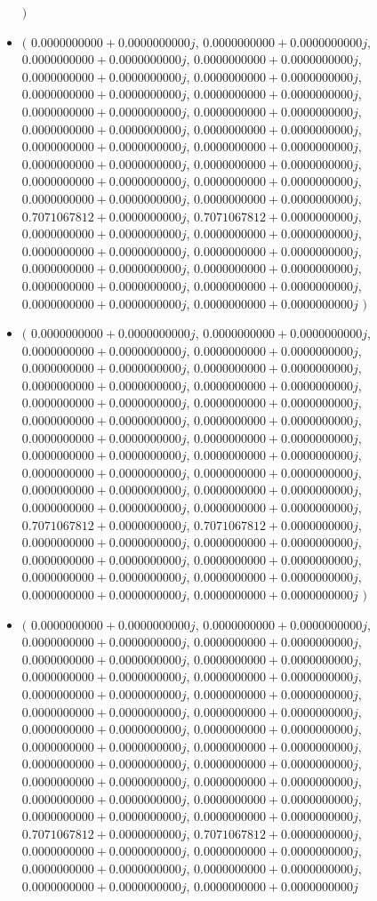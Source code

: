 \documentclass[14pt,a4paper]{article}
\begin{document}
\begin{itemize}
$\big)$
\item
$\big($
$0.0000000000+0.0000000000j$, $0.0000000000+0.0000000000j$, $0.0000000000+0.0000000000j$, $0.0000000000+0.0000000000j$, $0.0000000000+0.0000000000j$, $0.0000000000+0.0000000000j$, $0.0000000000+0.0000000000j$, $0.0000000000+0.0000000000j$, $0.0000000000+0.0000000000j$, $0.0000000000+0.0000000000j$, $0.0000000000+0.0000000000j$, $0.0000000000+0.0000000000j$, $0.0000000000+0.0000000000j$, $0.0000000000+0.0000000000j$, $0.0000000000+0.0000000000j$, $0.0000000000+0.0000000000j$, $0.0000000000+0.0000000000j$, $0.0000000000+0.0000000000j$, $0.0000000000+0.0000000000j$, $0.0000000000+0.0000000000j$, $0.7071067812+0.0000000000j$, $0.7071067812+0.0000000000j$, $0.0000000000+0.0000000000j$, $0.0000000000+0.0000000000j$, $0.0000000000+0.0000000000j$, $0.0000000000+0.0000000000j$, $0.0000000000+0.0000000000j$, $0.0000000000+0.0000000000j$, $0.0000000000+0.0000000000j$, $0.0000000000+0.0000000000j$, $0.0000000000+0.0000000000j$, $0.0000000000+0.0000000000j$
$\big)$
\item
$\big($
$0.0000000000+0.0000000000j$, $0.0000000000+0.0000000000j$, $0.0000000000+0.0000000000j$, $0.0000000000+0.0000000000j$, $0.0000000000+0.0000000000j$, $0.0000000000+0.0000000000j$, $0.0000000000+0.0000000000j$, $0.0000000000+0.0000000000j$, $0.0000000000+0.0000000000j$, $0.0000000000+0.0000000000j$, $0.0000000000+0.0000000000j$, $0.0000000000+0.0000000000j$, $0.0000000000+0.0000000000j$, $0.0000000000+0.0000000000j$, $0.0000000000+0.0000000000j$, $0.0000000000+0.0000000000j$, $0.0000000000+0.0000000000j$, $0.0000000000+0.0000000000j$, $0.0000000000+0.0000000000j$, $0.0000000000+0.0000000000j$, $0.0000000000+0.0000000000j$, $0.0000000000+0.0000000000j$, $0.7071067812+0.0000000000j$, $0.7071067812+0.0000000000j$, $0.0000000000+0.0000000000j$, $0.0000000000+0.0000000000j$, $0.0000000000+0.0000000000j$, $0.0000000000+0.0000000000j$, $0.0000000000+0.0000000000j$, $0.0000000000+0.0000000000j$, $0.0000000000+0.0000000000j$, $0.0000000000+0.0000000000j$
$\big)$
\item
$\big($
$0.0000000000+0.0000000000j$, $0.0000000000+0.0000000000j$, $0.0000000000+0.0000000000j$, $0.0000000000+0.0000000000j$, $0.0000000000+0.0000000000j$, $0.0000000000+0.0000000000j$, $0.0000000000+0.0000000000j$, $0.0000000000+0.0000000000j$, $0.0000000000+0.0000000000j$, $0.0000000000+0.0000000000j$, $0.0000000000+0.0000000000j$, $0.0000000000+0.0000000000j$, $0.0000000000+0.0000000000j$, $0.0000000000+0.0000000000j$, $0.0000000000+0.0000000000j$, $0.0000000000+0.0000000000j$, $0.0000000000+0.0000000000j$, $0.0000000000+0.0000000000j$, $0.0000000000+0.0000000000j$, $0.0000000000+0.0000000000j$, $0.0000000000+0.0000000000j$, $0.0000000000+0.0000000000j$, $0.0000000000+0.0000000000j$, $0.0000000000+0.0000000000j$, $0.7071067812+0.0000000000j$, $0.7071067812+0.0000000000j$, $0.0000000000+0.0000000000j$, $0.0000000000+0.0000000000j$, $0.0000000000+0.0000000000j$, $0.0000000000+0.0000000000j$, $0.0000000000+0.0000000000j$, $0.0000000000+0.0000000000j$

\end{itemize}
\end{document}
